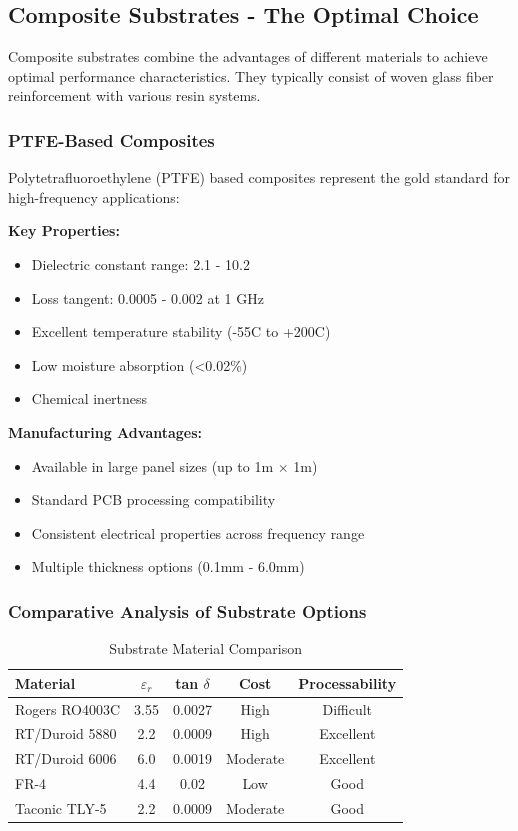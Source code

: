 \documentclass[12pt]{article}
\begin{document}
\subsection{Composite Substrates - The Optimal Choice}

Composite substrates combine the advantages of different materials to achieve optimal performance characteristics. They typically consist of woven glass fiber reinforcement with various resin systems.

\subsubsection{PTFE-Based Composites}

Polytetrafluoroethylene (PTFE) based composites represent the gold standard for high-frequency applications:

\textbf{Key Properties:}
\begin{itemize}
    \item Dielectric constant range: 2.1 - 10.2
    \item Loss tangent: 0.0005 - 0.002 at 1 GHz
    \item Excellent temperature stability (-55\textdegree C to +200\textdegree C)
    \item Low moisture absorption (<0.02\%)
    \item Chemical inertness
\end{itemize}

\textbf{Manufacturing Advantages:}
\begin{itemize}
    \item Available in large panel sizes (up to 1m $\times$ 1m)
    \item Standard PCB processing compatibility
    \item Consistent electrical properties across frequency range
    \item Multiple thickness options (0.1mm - 6.0mm)
\end{itemize}

\subsubsection{Comparative Analysis of Substrate Options}

\begin{table}[H]
\centering
\caption{Substrate Material Comparison}
\begin{tabular}{|l|c|c|c|c|}
\hline
\textbf{Material} & \textbf{$\varepsilon_r$} & \textbf{tan $\delta$} & \textbf{Cost} & \textbf{Processability} \\
\hline
Rogers RO4003C  & 3.55 & 0.0027 & High & Difficult \\
\hline
RT/Duroid 5880 & 2.2 & 0.0009 & High & Excellent \\
\hline
RT/Duroid 6006 & 6.0 & 0.0019 & Moderate & Excellent \\
\hline
FR-4 & 4.4 & 0.02 & Low & Good \\
\hline
Taconic TLY-5 & 2.2 & 0.0009 & Moderate & Good \\
\hline
\end{tabular}
\end{table}
\end{document}
